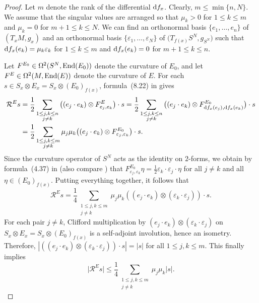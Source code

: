 \begin{proof}
Let $m$ denote the rank of the differential ${\rm d}f_x$. Clearly, $m \leq \min \{n,N\}$. We assume that the singular values are arranged so that $\mu_k > 0$ for $1 \leq k \leq m$ and $\mu_k = 0$ for $m+1 \leq k \leq N$. We can find an orthonormal basis $\{e_1,\hdots,e_n\}$ of $(T_x M, g_x)$ and an orthonormal basis $\{\varepsilon_1, \ldots, \varepsilon_N\}$ of $\big(T_{f(x)} S^N, g_{S^N}\big)$ such that ${\rm d}f_x(e_k) = \mu_k \varepsilon_k$ for $1 \leq k \leq m$ and ${\rm d}f_x(e_k) = 0$ for $m+1 \leq k \leq n$.

Let $F^{E_0} \in \Omega^2(S^N, {\rm End}(E_0))$ denote the curvature of $E_0$, and let $F^E \in \Omega^2(M, {\rm End}(E))$ denote the curvature of $E$. For each $s \in S_x \otimes E_x = S_x \otimes (E_0)_{f(x)}$, formula~(8.22) in \cite[Chapter II]{Lawson-Michelsohn} gives
\begin{align*}
\mathcal{R}^E s
&= \frac{1}{2} \sum_{\substack{1 \leq j,k \leq n\\ j \neq k}} \big((e_j \cdot e_k) \otimes F^E_{e_j, e_k}\big) \cdot s = \frac{1}{2} \sum_{\substack{1 \leq j,k \leq n\\ j \neq k}} \big((e_j \cdot e_k) \otimes F^{E_0}_{{\rm d}f_x(e_j), {\rm d}f_x(e_k)}\big) \cdot s \\
&= \frac{1}{2} \sum_{\substack{1 \leq j,k \leq m\\ j \neq k}} \mu_j \mu_k \big((e_j \cdot e_k) \otimes F^{E_0}_{\varepsilon_j,\varepsilon_k}\big) \cdot s.
\end{align*}
Since the curvature operator of $S^N$ acts as the identity on $2$-forms, we obtain by formula~(4.37) in \cite[Chapter II]{Lawson-Michelsohn} (also compare \cite[Lemma 4.3]{Llarull}) that $F^{E_0}_{\varepsilon_j,\varepsilon_k} \eta = \frac{1}{2} \varepsilon_k \cdot \varepsilon_j \cdot \eta$ for all $j \neq k$ and all $\eta \in (E_0)_{f(x)}$.
Putting everything together, it follows that
\[
 \mathcal{R}^E s = \frac{1}{4} \sum_{\substack{1 \leq j,k \leq m\\ j \neq k}} \mu_j \mu_k ((e_j \cdot e_k) \otimes (\varepsilon_k \cdot \varepsilon_j)) \cdot s.
\]
For each pair $j \neq k$, Clifford multiplication by $(e_j \cdot e_k) \otimes (\varepsilon_k \cdot \varepsilon_j)$ on $S_x \otimes E_x = S_x \otimes (E_0)_{f(x)}$ is a self-adjoint involution, hence an isometry.
Therefore, $
 |((e_j \cdot e_k) \otimes (\varepsilon_k \cdot \varepsilon_j)) \cdot s| = |s|$ for all $1 \leq j,k \leq m$.
This finally implies
\begin{equation*}
\big|\mathcal{R}^E s\big| \leq \frac{1}{4} \sum_{\substack{1 \leq j,k \leq m\\ j \neq k}} \mu_j \mu_k |s|.\tag*{\qed}
\end{equation*} \renewcommand{\qed}{}
\end{proof}

